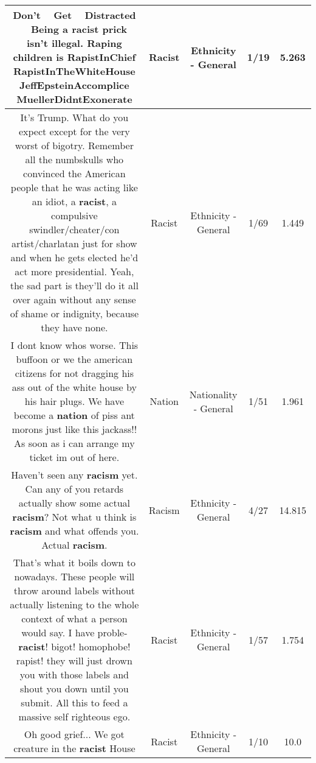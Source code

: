 \documentclass[11pt]{article}
\newlength\mylength
\begin{document}
\begin{center}
\begin{longtable}{|C{.65\mylength}|C{.30\mylength}|C{.12\mylength}|C{.12\mylength}|C{.12\mylength}|}
  \small Don't 👏🏾 Get 👏🏾 Distracted 👏🏾 Being a \textbf{racist} prick isn't illegal. Raping children is RapistInChief RapistInTheWhiteHouse JeffEpsteinAccomplice MuellerDidntExonerate\normalsize   & Racist & Ethnicity - General & 1/19 & 5.263 \\  \hline
  \small It's Trump. What do you expect except for the very worst of bigotry. Remember all the numbskulls who convinced the American people that he was acting like an idiot, a \textbf{racist}, a compulsive swindler/cheater/con artist/charlatan just for show and when he gets elected he'd act more presidential. Yeah, the sad part is they'll do it all over again without any sense of shame or indignity, because they have none.\normalsize   & Racist & Ethnicity - General & 1/69 & 1.449 \\  \hline
  \small I dont know whos worse. This buffoon or we the american citizens for not dragging his ass out of the white house by his hair plugs. We have become a \textbf{nation} of piss ant morons just like this jackass!! As soon as i can arrange my ticket im out of here.\normalsize   & Nation & Nationality - General & 1/51 & 1.961 \\  \hline
  \small Haven't seen any \textbf{racism} yet. Can any of you retards actually show some actual \textbf{racism}? Not what u think is \textbf{racism} and what offends you. Actual \textbf{racism}.\normalsize   & Racism & Ethnicity - General & 4/27 & 14.815 \\  \hline
  \small That's what it boils down to nowadays. These people will throw around labels without actually listening to the whole context of what a person would say. I have proble- \textbf{racist}! bigot! homophobe! rapist! they will just drown you with those labels and shout you down until you submit. All this to feed a massive self righteous ego.\normalsize   & Racist & Ethnicity - General & 1/57 & 1.754 \\  \hline
  \small Oh good grief... We got creature in the \textbf{racist} House\normalsize   & Racist & Ethnicity - General & 1/10 & 10.0 \\  \hline

\end{longtable}
\end{center}
\end{document}
